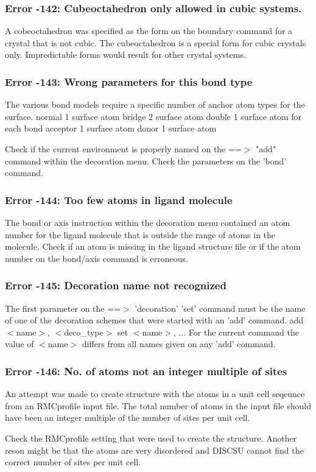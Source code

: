 \subsubsection{Error -142: Cubeoctahedron only allowed in cubic systems.}
\par
A cobeoctahedron was specified as the form on the boundary 
command for a crystal that is not cubic. The 
cubeoctahedron is a special form for cubic crystals only. 
Impredictable forms would result for other crystal systems. 
\subsubsection{Error -143: Wrong parameters for this bond type}
\par
The various bond models require a specific number of 
anchor atom types for the surface. 
normal   1 surface atom 
bridge   2 surface atom 
double   1 surface atom for each bond 
acceptor 1 surface atom 
donor    1 surface atom 
\par
Check if the current environment is properly named 
on the ==$> $ "add" command within the decoration menu. 
Check the parameters on the 'bond' command. 
\subsubsection{Error -144: Too few atoms in ligand molecule}
\par
The bond or axis instruction within the decoration menu 
contained an atom number for the ligand molecule that is 
outside the range of atoms in the molecule. Check if an 
atom is missing in the ligand structure file or if the 
atom number on the bond/axis command is erroneous. 
\subsubsection{Error -145: Decoration name not recognized}
\par
The first parameter on the ==$> $ 'decoration' 'set' 
command must be the name of one of the decoration 
schemes that were started with an 'add' command. 
add $ <$name$> $, $ <$deco\_type$> $ 
set $ <$name$> $, ... 
For the current command the value of $ <$name$> $ differs 
from all names given on any 'add' command. 
\subsubsection{Error -146: No. of atoms not an integer multiple of sites}
\par
An attempt was made to create structure with the atoms 
in a unit cell seqeunce from an RMCprofile input file. 
The total number of atoms in the input file should 
have been an integer multiple of the number of 
sites per unit cell. 
\par
Check the RMCprofile setting that were used to create the 
structure. Another reson might be that the atoms are 
very disordered and DISCSU cannot find the correct number 
of sites per unit cell. 
\par
